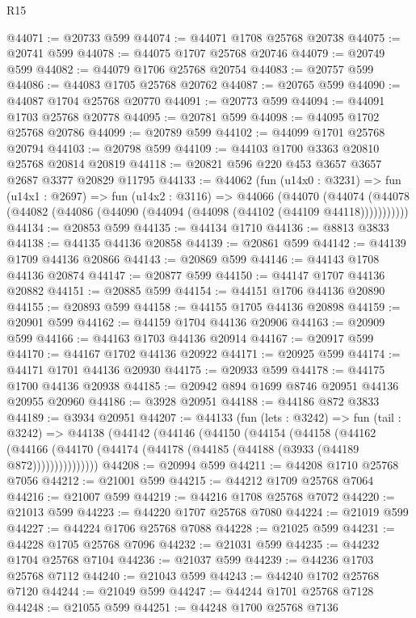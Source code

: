 \begin{lexlean}{R15}
\begin{coremodule}
@44071 := @20733 @599
@44074 := @44071 @1708 @25768 @20738
@44075 := @20741 @599
@44078 := @44075 @1707 @25768 @20746
@44079 := @20749 @599
@44082 := @44079 @1706 @25768 @20754
@44083 := @20757 @599
@44086 := @44083 @1705 @25768 @20762
@44087 := @20765 @599
@44090 := @44087 @1704 @25768 @20770
@44091 := @20773 @599
@44094 := @44091 @1703 @25768 @20778
@44095 := @20781 @599
@44098 := @44095 @1702 @25768 @20786
@44099 := @20789 @599
@44102 := @44099 @1701 @25768 @20794
@44103 := @20798 @599
@44109 := @44103 @1700 @3363 @20810 @25768 @20814 @20819
@44118 := @20821 @596 @220 @453 @3657 @3657 @2687 @3377 @20829 @11795
@44133 := @44062
    (fun (u14x0 : @3231) =>
    fun (u14x1 : @2697) =>
    fun (u14x2 : @3116) =>
    @44066
      (@44070
        (@44074 (@44078 (@44082 (@44086 (@44090 (@44094 (@44098 (@44102 (@44109 @44118)))))))))))
@44134 := @20853 @599
@44135 := @44134 @1710
@44136 := @8813 @3833
@44138 := @44135 @44136 @20858
@44139 := @20861 @599
@44142 := @44139 @1709 @44136 @20866
@44143 := @20869 @599
@44146 := @44143 @1708 @44136 @20874
@44147 := @20877 @599
@44150 := @44147 @1707 @44136 @20882
@44151 := @20885 @599
@44154 := @44151 @1706 @44136 @20890
@44155 := @20893 @599
@44158 := @44155 @1705 @44136 @20898
@44159 := @20901 @599
@44162 := @44159 @1704 @44136 @20906
@44163 := @20909 @599
@44166 := @44163 @1703 @44136 @20914
@44167 := @20917 @599
@44170 := @44167 @1702 @44136 @20922
@44171 := @20925 @599
@44174 := @44171 @1701 @44136 @20930
@44175 := @20933 @599
@44178 := @44175 @1700 @44136 @20938
@44185 := @20942 @894 @1699 @8746 @20951 @44136 @20955 @20960
@44186 := @3928 @20951
@44188 := @44186 @872 @3833
@44189 := @3934 @20951
@44207 := @44133
    (fun (lets : @3242) =>
    fun (tail : @3242) =>
    @44138
      (@44142
        (@44146
          (@44150
            (@44154
              (@44158
                (@44162
                  (@44166 (@44170 (@44174 (@44178 (@44185 (@44188 (@3933 (@44189 @872)))))))))))))))
@44208 := @20994 @599
@44211 := @44208 @1710 @25768 @7056
@44212 := @21001 @599
@44215 := @44212 @1709 @25768 @7064
@44216 := @21007 @599
@44219 := @44216 @1708 @25768 @7072
@44220 := @21013 @599
@44223 := @44220 @1707 @25768 @7080
@44224 := @21019 @599
@44227 := @44224 @1706 @25768 @7088
@44228 := @21025 @599
@44231 := @44228 @1705 @25768 @7096
@44232 := @21031 @599
@44235 := @44232 @1704 @25768 @7104
@44236 := @21037 @599
@44239 := @44236 @1703 @25768 @7112
@44240 := @21043 @599
@44243 := @44240 @1702 @25768 @7120
@44244 := @21049 @599
@44247 := @44244 @1701 @25768 @7128
@44248 := @21055 @599
@44251 := @44248 @1700 @25768 @7136

\end{coremodule}
\end{lexlean}
